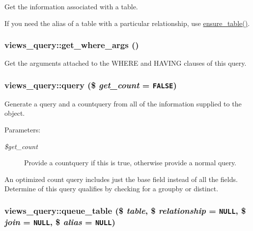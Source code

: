 Get the information associated with a table.

If you need the alias of a table with a particular relationship, use \hyperlink{classviews__query_78c615fc19826e8a640ab27874e2fdaf}{ensure\_\-table()}. \hypertarget{classviews__query_caf5f2625a89d8b29e6d9ad6127d1b17}{
\subsubsection[{get\_\-where\_\-args}]{\setlength{\rightskip}{0pt plus 5cm}views\_\-query::get\_\-where\_\-args ()}}
\label{classviews__query_caf5f2625a89d8b29e6d9ad6127d1b17}


Get the arguments attached to the WHERE and HAVING clauses of this query. \hypertarget{classviews__query_50460c7856f25847d361a45a6c1d4b69}{
\subsubsection[{query}]{\setlength{\rightskip}{0pt plus 5cm}views\_\-query::query (\$ {\em get\_\-count} = {\tt FALSE})}}
\label{classviews__query_50460c7856f25847d361a45a6c1d4b69}


Generate a query and a countquery from all of the information supplied to the object.

\begin{Desc}
\item[Parameters:]
\begin{description}
\item[{\em \$get\_\-count}]Provide a countquery if this is true, otherwise provide a normal query. \end{description}
\end{Desc}


An optimized count query includes just the base field instead of all the fields. Determine of this query qualifies by checking for a groupby or distinct.\hypertarget{classviews__query_0ed3905be8cddfdbde96a39569686bcb}{
\subsubsection[{queue\_\-table}]{\setlength{\rightskip}{0pt plus 5cm}views\_\-query::queue\_\-table (\$ {\em table}, \/  \$ {\em relationship} = {\tt NULL}, \/  \$ {\em join} = {\tt NULL}, \/  \$ {\em alias} = {\tt NULL})}}
\label{classviews__query_0ed3905be8cddfdbde96a39569686bcb}


